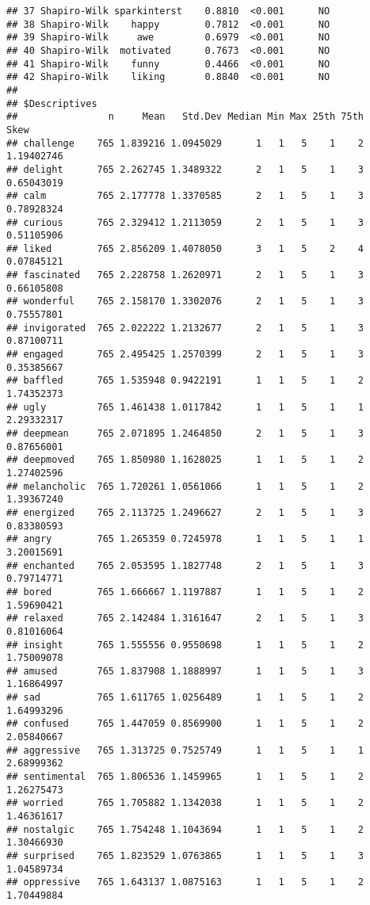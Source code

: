 \documentclass[
]{article}
\begin{document}
\begin{verbatim}
## 37 Shapiro-Wilk sparkinterst    0.8810  <0.001      NO    
## 38 Shapiro-Wilk    happy        0.7812  <0.001      NO    
## 39 Shapiro-Wilk     awe         0.6979  <0.001      NO    
## 40 Shapiro-Wilk  motivated      0.7673  <0.001      NO    
## 41 Shapiro-Wilk    funny        0.4466  <0.001      NO    
## 42 Shapiro-Wilk    liking       0.8840  <0.001      NO    
## 
## $Descriptives
##                n     Mean   Std.Dev Median Min Max 25th 75th        Skew
## challenge    765 1.839216 1.0945029      1   1   5    1    2  1.19402746
## delight      765 2.262745 1.3489322      2   1   5    1    3  0.65043019
## calm         765 2.177778 1.3370585      2   1   5    1    3  0.78928324
## curious      765 2.329412 1.2113059      2   1   5    1    3  0.51105906
## liked        765 2.856209 1.4078050      3   1   5    2    4  0.07845121
## fascinated   765 2.228758 1.2620971      2   1   5    1    3  0.66105808
## wonderful    765 2.158170 1.3302076      2   1   5    1    3  0.75557801
## invigorated  765 2.022222 1.2132677      2   1   5    1    3  0.87100711
## engaged      765 2.495425 1.2570399      2   1   5    1    3  0.35385667
## baffled      765 1.535948 0.9422191      1   1   5    1    2  1.74352373
## ugly         765 1.461438 1.0117842      1   1   5    1    1  2.29332317
## deepmean     765 2.071895 1.2464850      2   1   5    1    3  0.87656001
## deepmoved    765 1.850980 1.1628025      1   1   5    1    2  1.27402596
## melancholic  765 1.720261 1.0561066      1   1   5    1    2  1.39367240
## energized    765 2.113725 1.2496627      2   1   5    1    3  0.83380593
## angry        765 1.265359 0.7245978      1   1   5    1    1  3.20015691
## enchanted    765 2.053595 1.1827748      2   1   5    1    3  0.79714771
## bored        765 1.666667 1.1197887      1   1   5    1    2  1.59690421
## relaxed      765 2.142484 1.3161647      2   1   5    1    3  0.81016064
## insight      765 1.555556 0.9550698      1   1   5    1    2  1.75009078
## amused       765 1.837908 1.1888997      1   1   5    1    3  1.16864997
## sad          765 1.611765 1.0256489      1   1   5    1    2  1.64993296
## confused     765 1.447059 0.8569900      1   1   5    1    2  2.05840667
## aggressive   765 1.313725 0.7525749      1   1   5    1    1  2.68999362
## sentimental  765 1.806536 1.1459965      1   1   5    1    2  1.26275473
## worried      765 1.705882 1.1342038      1   1   5    1    2  1.46361617
## nostalgic    765 1.754248 1.1043694      1   1   5    1    2  1.30466930
## surprised    765 1.823529 1.0763865      1   1   5    1    3  1.04589734
## oppressive   765 1.643137 1.0875163      1   1   5    1    2  1.70449884

\end{verbatim}
\end{document}
